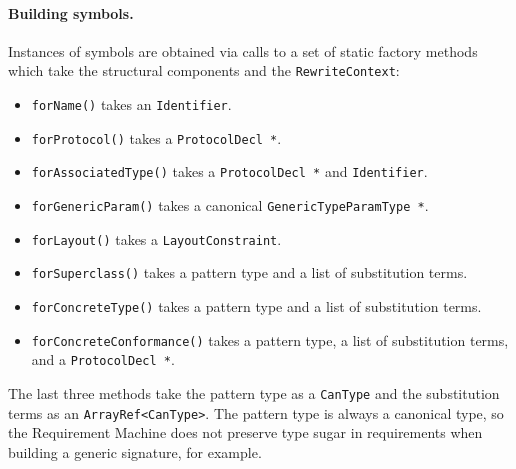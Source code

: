 \documentclass[../generics]{subfiles}
\begin{document}
\paragraph{Building symbols.}
Instances of symbols are obtained via calls to a set of static factory methods which take the structural components and the \texttt{RewriteContext}:
\begin{itemize}
\item \texttt{forName()} takes an \texttt{Identifier}.
\item \texttt{forProtocol()} takes a \texttt{ProtocolDecl *}.
\item \texttt{forAssociatedType()} takes a \texttt{ProtocolDecl *} and \texttt{Identifier}.
\item \texttt{forGenericParam()} takes a canonical \texttt{GenericTypeParamType *}.
\item \texttt{forLayout()} takes a \texttt{LayoutConstraint}.
\item \texttt{forSuperclass()} takes a pattern type and a list of substitution terms.
\item \texttt{forConcreteType()} takes a pattern type and a list of substitution terms.
\item \texttt{forConcreteConformance()} takes a pattern type, a list of substitution terms, and a \texttt{ProtocolDecl *}.
\end{itemize}
The last three methods take the pattern type as a \texttt{CanType} and the substitution terms as an \texttt{ArrayRef<CanType>}. The pattern type is always a canonical type, so the Requirement Machine does not preserve type sugar in requirements when building a generic signature, for example.
\end{document}
